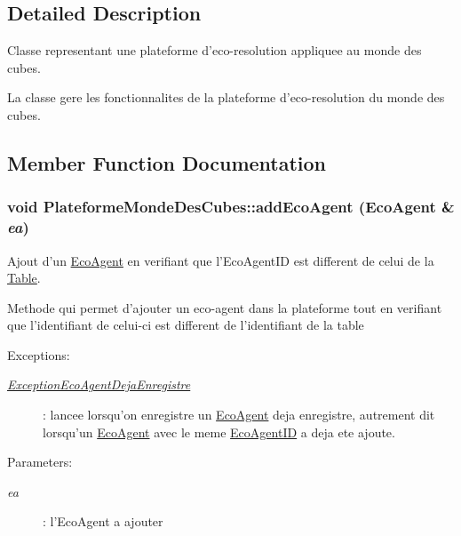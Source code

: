 \subsection{Detailed Description}
Classe representant une plateforme d'eco-resolution appliquee au monde des cubes. 

La classe gere les fonctionnalites de la plateforme d'eco-resolution du monde des cubes. 

\subsection{Member Function Documentation}
\hypertarget{classPlateformeMondeDesCubes_6fb5b9ececb0e7893b2c7ff5531cb3b1}{
\subsubsection[{addEcoAgent}]{\setlength{\rightskip}{0pt plus 5cm}void PlateformeMondeDesCubes::addEcoAgent ({\bf EcoAgent} \& {\em ea})}}
\label{classPlateformeMondeDesCubes_6fb5b9ececb0e7893b2c7ff5531cb3b1}


Ajout d'un \hyperlink{classEcoAgent}{EcoAgent} en verifiant que l'EcoAgentID est different de celui de la \hyperlink{classTable}{Table}. 

Methode qui permet d'ajouter un eco-agent dans la plateforme tout en verifiant que l'identifiant de celui-ci est different de l'identifiant de la table \begin{Desc}
\item[Exceptions:]
\begin{description}
\item[{\em \hyperlink{classExceptionEcoAgentDejaEnregistre}{ExceptionEcoAgentDejaEnregistre}}]: lancee lorsqu'on enregistre un \hyperlink{classEcoAgent}{EcoAgent} deja enregistre, autrement dit lorsqu'un \hyperlink{classEcoAgent}{EcoAgent} avec le meme \hyperlink{classEcoAgentID}{EcoAgentID} a deja ete ajoute. \end{description}
\end{Desc}
\begin{Desc}
\item[Parameters:]
\begin{description}
\item[{\em ea}]: l'EcoAgent a ajouter \end{description}
\end{Desc}


